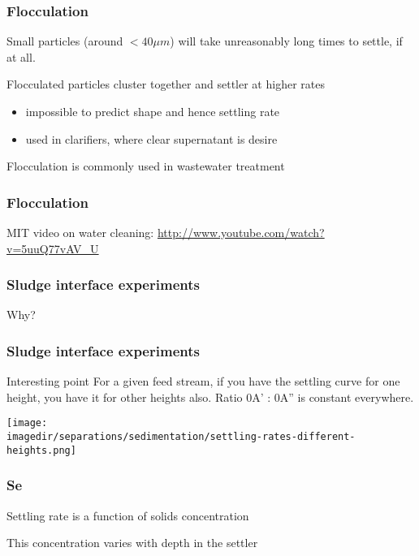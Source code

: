 \begin{frame}\frametitle{Flocculation}
	Small particles (around $< 40 \mu m$) will take unreasonably long times to settle, if at all.
	
	Flocculated particles cluster together and settler at higher rates
	\begin{itemize}
		\item	impossible to predict shape and hence settling rate
		\item	used in clarifiers, where clear supernatant is desire
	\end{itemize}
	
	Flocculation is commonly used in wastewater treatment
	
\end{frame}

\begin{frame}\frametitle{Flocculation}
	MIT video on water cleaning: \href{http://www.youtube.com/watch?v=5uuQ77vAV\_U}{http://www.youtube.com/watch?v=5uuQ77vAV\_U}
	\href{}{}
\end{frame}

\begin{frame}\frametitle{Sludge interface experiments}
	Why?
\end{frame}

\begin{frame}\frametitle{Sludge interface experiments}


	\begin{exampleblock}{Interesting point}
		For a given feed stream, if you have the settling curve for one height, you have it for other heights also. Ratio 0A' : 0A'' is constant everywhere.
	\end{exampleblock}
	
	\begin{center}
		\texttt{[image: \\imagedir/separations/sedimentation/settling-rates-different-heights.png]}
	\end{center}	
\end{frame}

\begin{frame}\frametitle{Se}
	Settling rate is a function of solids concentration
	
	This concentration varies with depth in the settler
\end{frame}

